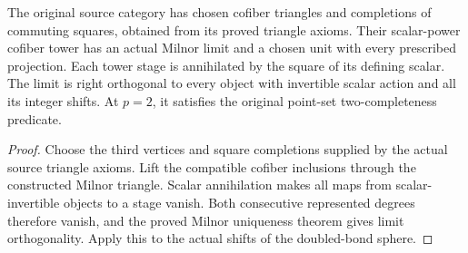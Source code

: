 \begin{proposition}
  \label{prop:actual-source-moore-construction}
  \leanok
  The original source category has chosen cofiber triangles and completions of commuting squares, obtained from its proved triangle axioms. Their scalar-power cofiber tower has an actual Milnor limit and a chosen unit with every prescribed projection. Each tower stage is annihilated by the square of its defining scalar. The limit is right orthogonal to every object with invertible scalar action and all its integer shifts. At $p=2$, it satisfies the original point-set two-completeness predicate.
\end{proposition}
\begin{proof}
  Choose the third vertices and square completions supplied by the actual source triangle axioms. Lift the compatible cofiber inclusions through the constructed Milnor triangle. Scalar annihilation makes all maps from scalar-invertible objects to a stage vanish. Both consecutive represented degrees therefore vanish, and the proved Milnor uniqueness theorem gives limit orthogonality. Apply this to the actual shifts of the doubled-bond sphere.
  \leanok
\end{proof}

